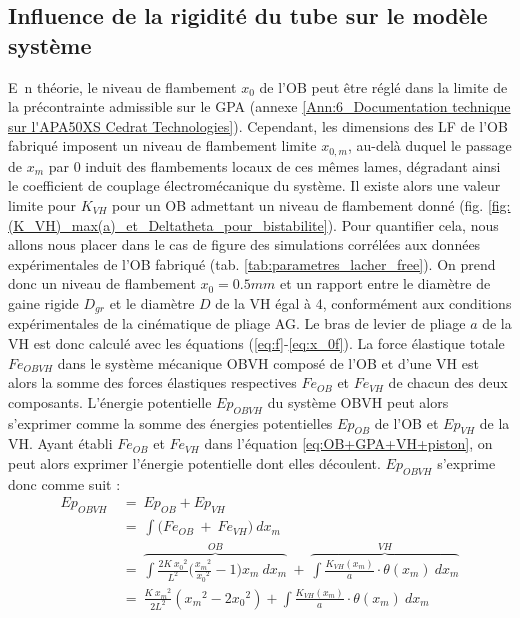 	\subsection{Influence de la rigidité du tube sur le modèle système}
	\label{sec:6.1.1_Impact du tube sur le comportement mecanique de l'OB}
\lettrine[lines=1]{E~}{}n théorie, le niveau de flambement $x_0$ de l'OB peut être réglé dans la limite de la précontrainte admissible sur le GPA (annexe \ref{Ann:6_Documentation technique sur l'APA50XS Cedrat Technologies}). Cependant, les dimensions des LF de l'OB fabriqué imposent un niveau de flambement limite $x_{0,m}$, au-delà duquel le passage de $x_m$ par 0 induit des flambements locaux de ces mêmes lames, dégradant ainsi le coefficient de couplage électromécanique du système. Il existe alors une valeur limite pour $K_{VH}$ pour un OB admettant un niveau de flambement donné (fig. \ref{fig:(K_VH)_max(a)_et_Deltatheta_pour_bistabilite}). Pour quantifier cela, nous allons nous placer dans le cas de figure des simulations corrélées aux données expérimentales de l'OB fabriqué (tab. \ref{tab:parametres_lacher_free}). On prend donc un niveau de flambement $x_0 = 0.5mm$ et un rapport entre le diamètre de gaine rigide $D_{gr}$ et le diamètre $D$ de la VH égal à 4, conformément aux conditions expérimentales de la cinématique de pliage AG. Le bras de levier de pliage $a$ de la VH est donc calculé avec les équations (\ref{eq:f}-\ref{eq:x_0f}). La force élastique totale $Fe_{OBVH}$ dans le système mécanique OBVH composé de l'OB et d'une VH est alors la somme des forces élastiques respectives $Fe_{OB}$ et $Fe_{VH}$ de chacun des deux composants. L'énergie potentielle $Ep_{OBVH}$ du système OBVH peut alors s'exprimer comme la somme des énergies potentielles $Ep_{OB}$ de l'OB et $Ep_{VH}$ de la VH. Ayant établi $Fe_{OB}$ et $Fe_{VH}$ dans l'équation \ref{eq:OB+GPA+VH+piston}, on peut alors exprimer l'énergie potentielle dont elles découlent. $Ep_{OBVH}$ s'exprime donc comme suit : 
\begin{equation}
\begin{split}
Ep_{OBVH}\ &=\ Ep_{OB} + Ep_{VH}\\
\ &=\
\int \biggl(Fe_{OB}\ +\ Fe_{VH}\biggr)\ dx_m \\
\ &=\
\overbrace{\int \frac{2K\ {x_0}^2}{L^2}\biggl(\frac{{x_m}^2}{{x_0}^2}-1\biggr){x_m}\ d{x_m}}^{OB}~ + ~
\overbrace{\int \frac{K_{VH}(x_m)}{a}\cdot \theta({x_m})\ dx_m}^{VH}\\
\ &=\
\frac{K\ {x_m}^2}{2L^2}({x_m}^2-2{x_0}^2) + \int \frac{K_{VH}(x_m)}{a}\cdot \theta({x_m})\ dx_m
\end{split}
\label{eq:Ep_OBVH}
\end{equation}
